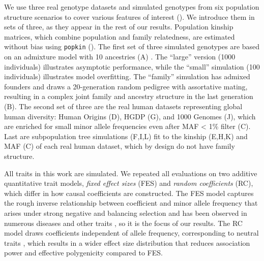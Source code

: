 \documentclass[9pt,lineno]{elife}
\begin{document}
We use three real genotype datasets and simulated genotypes from six population structure scenarios to cover various features of interest ().
We introduce them in sets of three, as they appear in the rest of our results.
Population kinship matrices, which combine population and family relatedness, are estimated without bias using \texttt{popkin} \citep{ochoa_estimating_2021} ().
The first set of three simulated genotypes are based on an admixture model with 10 ancestries (A) \citep{ochoa_estimating_2021, gopalan_scaling_2016, cabreros_likelihood-free_2019}.
The ``large'' version (1000 individuals) illustrates asymptotic performance, while the ``small'' simulation (100 individuals) illustrates model overfitting.
The ``family'' simulation has admixed founders and draws a 20-generation random pedigree with assortative mating, resulting in a complex joint family and ancestry structure in the last generation (B).
The second set of three are the real human datasets representing global human diversity: Human Origins (D), HGDP (G), and 1000 Genomes (J), which are enriched for small minor allele frequencies even after MAF < 1\% filter (C).
Last are subpopulation tree simulations (F,I,L) fit to the kinship (E,H,K) and MAF (C) of each real human dataset, which by design do not have family structure.

All traits in this work are simulated.
We repeated all evaluations on two additive quantitative trait models, \textit{fixed effect sizes} (FES) and \textit{random coefficients} (RC), which differ in how causal coefficients are constructed.
The FES model captures the rough inverse relationship between coefficient and minor allele frequency that arises under strong negative and balancing selection and has been observed in numerous diseases and other traits \citep{park_distribution_2011, zeng_signatures_2018, simons_population_2018, oconnor_extreme_2019}, so it is the focus of our results.
The RC model draws coefficients independent of allele frequency, corresponding to neutral traits \citep{zeng_signatures_2018, simons_population_2018}, which results in a wider effect size distribution that reduces association power and effective polygenicity compared to FES.
\end{document}
